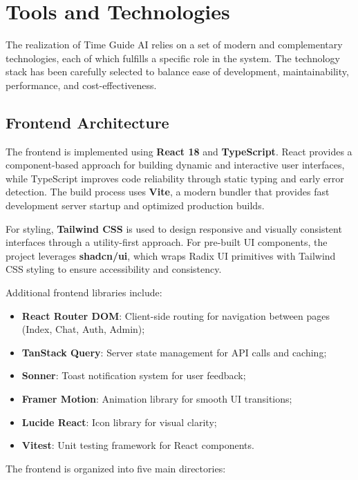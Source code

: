 \section{Tools and Technologies}

The realization of Time Guide AI relies on a set of modern and complementary technologies, each of which fulfills a specific role in the system. The technology stack has been carefully selected to balance ease of development, maintainability, performance, and cost-effectiveness.

\subsection{Frontend Architecture}
The frontend is implemented using \textbf{React 18} and \textbf{TypeScript}. React provides a component-based approach for building dynamic and interactive user interfaces, while TypeScript improves code reliability through static typing and early error detection. The build process uses \textbf{Vite}, a modern bundler that provides fast development server startup and optimized production builds.

For styling, \textbf{Tailwind CSS} is used to design responsive and visually consistent interfaces through a utility-first approach. For pre-built UI components, the project leverages \textbf{shadcn/ui}, which wraps Radix UI primitives with Tailwind CSS styling to ensure accessibility and consistency.

Additional frontend libraries include:

\begin{itemize}
    \item \textbf{React Router DOM}: Client-side routing for navigation between pages (Index, Chat, Auth, Admin);
    \item \textbf{TanStack Query}: Server state management for API calls and caching;
    \item \textbf{Sonner}: Toast notification system for user feedback;
    \item \textbf{Framer Motion}: Animation library for smooth UI transitions;
    \item \textbf{Lucide React}: Icon library for visual clarity;
    \item \textbf{Vitest}: Unit testing framework for React components.
\end{itemize}

The frontend is organized into five main directories:


